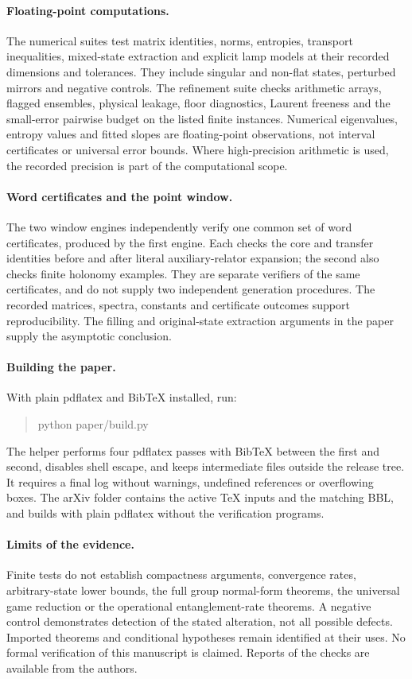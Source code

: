 \paragraph{Floating-point computations.}
The numerical suites test matrix identities, norms, entropies, transport inequalities, mixed-state extraction and explicit lamp models at their recorded dimensions and tolerances. They include singular and non-flat states, perturbed mirrors and negative controls. The refinement suite checks arithmetic arrays, flagged ensembles, physical leakage, floor diagnostics, Laurent freeness and the small-error pairwise budget on the listed finite instances. Numerical eigenvalues, entropy values and fitted slopes are floating-point observations, not interval certificates or universal error bounds. Where high-precision arithmetic is used, the recorded precision is part of the computational scope.

\paragraph{Word certificates and the point window.}
The two window engines independently verify one common set of word certificates, produced by the first engine. Each checks the core and transfer identities before and after literal auxiliary-relator expansion; the second also checks finite holonomy examples. They are separate verifiers of the same certificates, and do not supply two independent generation procedures. The recorded matrices, spectra, constants and certificate outcomes support reproducibility. The filling and original-state extraction arguments in the paper supply the asymptotic conclusion.

\paragraph{Building the paper.}
With plain pdflatex and BibTeX installed, run:
\begin{quote}\ttfamily\small
python paper/build.py
\end{quote}
The helper performs four pdflatex passes with BibTeX between the first and second, disables shell escape, and keeps intermediate files outside the release tree. It requires a final log without warnings, undefined references or overflowing boxes. The arXiv folder contains the active TeX inputs and the matching BBL, and builds with plain pdflatex without the verification programs.

\paragraph{Limits of the evidence.}
Finite tests do not establish compactness arguments, convergence rates, arbitrary-state lower bounds, the full group normal-form theorems, the universal game reduction or the operational entanglement-rate theorems. A negative control demonstrates detection of the stated alteration, not all possible defects. Imported theorems and conditional hypotheses remain identified at their uses. No formal verification of this manuscript is claimed. Reports of the checks are available from the authors.
